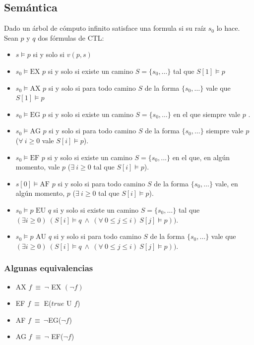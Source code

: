 \subsection{Semántica}
Dado un árbol de cómputo infinito satisface una formula si su raíz $s_0$ lo hace. Sean $p$ y $q$ dos fórmulas de CTL:
\begin{itemize}
    \item $s \vDash p$ si y solo si $v(p,s)$
    \item $s_0 \vDash \text{EX } p$ si y solo si existe un camino $S =\{s_0,\dots\}$ tal que $S[1]\vDash p$
    \item $s_0 \vDash \text{AX } p$ si y solo si para todo camino $S$ de la forma $\{s_0,\dots\}$ vale que $S[1]\vDash p$
    \item $s_0 \vDash \text{EG } p$ si y solo si existe un camino $S =\{s_0,\dots\}$ en el que siempre vale $p$ .
    \item $s_0 \vDash \text{AG } p$ si y solo si para todo camino $S$ de la forma $\{s_0,\dots\}$ siempre vale $p$ ($\forall~i\geq 0$ vale $S[i] \vDash p$).
    \item $s_0 \vDash \text{EF } p$ si y solo si existe un camino $S=\{s_0,...\}$ en el que, en algún momento, vale $p$ ($\exists~i\geq 0$ tal que  $S[i] \vDash p$).
    \item $s[0] \vDash \text{AF } p$ si y solo si para todo camino  $S$ de la forma $\{s_0,\dots\}$ vale, en algún momento, $p$ ($\exists~i\geq 0$ tal que  $S[i] \vDash p$).
    \item $s_0 \vDash p \text{ EU } q$ si y solo si existe un camino $S =\{s_0,\dots\}$ tal que \\\hspace*{1cm} $(\exists i\geq 0)~(S[i] \vDash q~\land~(\forall~ 0\leq j\leq i)~S[j]\vDash p))$.
    \item $s_0 \vDash p \text{ AU } q$ si y solo si para todo camino  $S$ de la forma $\{s_0,\dots\}$ vale que\\\hspace*{1cm} $(\exists i\geq 0)~(S[i] \vDash q~\land~(\forall~ 0\leq j\leq i)~S[j]\vDash p))$.
\end{itemize}

\subsubsection{Algunas equivalencias}
\begin{itemize}
\item AX $f~\equiv~\lnot$ EX $(\lnot f)$
\item EF $f~\equiv$ E($true$ U $f$)
\item AF $f~\equiv~\lnot$EG($\lnot f$)
\item AG $f~\equiv~\lnot$ EF($\lnot f$)
\end{itemize}
\newpage
